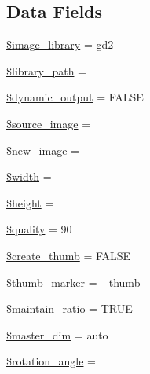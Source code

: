 \subsection*{Data Fields}
\begin{DoxyCompactItemize}
\item 
\mbox{\hyperlink{class_c_i___image__lib_ac4b224358e1169eec8db344bcb3186c0}{\$image\+\_\+library}} = \textquotesingle{}gd2\textquotesingle{}
\item 
\mbox{\hyperlink{class_c_i___image__lib_ac09f7fc802884aae2149f1df0e53f17a}{\$library\+\_\+path}} = \textquotesingle{}\textquotesingle{}
\item 
\mbox{\hyperlink{class_c_i___image__lib_ad90737913d82776e7d3a7dfaef68e167}{\$dynamic\+\_\+output}} = F\+A\+L\+SE
\item 
\mbox{\hyperlink{class_c_i___image__lib_a54fc395722d5e9f15d656d22ba84e382}{\$source\+\_\+image}} = \textquotesingle{}\textquotesingle{}
\item 
\mbox{\hyperlink{class_c_i___image__lib_a6147ac30032312f2b42a9b05618faf12}{\$new\+\_\+image}} = \textquotesingle{}\textquotesingle{}
\item 
\mbox{\hyperlink{class_c_i___image__lib_a5795120b4b324bc4ca83f1e6fdce7d57}{\$width}} = \textquotesingle{}\textquotesingle{}
\item 
\mbox{\hyperlink{class_c_i___image__lib_a2c265bba1724371bb03e6901297c30b2}{\$height}} = \textquotesingle{}\textquotesingle{}
\item 
\mbox{\hyperlink{class_c_i___image__lib_a0e342ea32cccdc2c932ad23b9796a62a}{\$quality}} = 90
\item 
\mbox{\hyperlink{class_c_i___image__lib_ab1250903cbadaaadb42ec188d38ab398}{\$create\+\_\+thumb}} = F\+A\+L\+SE
\item 
\mbox{\hyperlink{class_c_i___image__lib_a3176700c651c0c3cd8cfa186ba03302a}{\$thumb\+\_\+marker}} = \textquotesingle{}\+\_\+thumb\textquotesingle{}
\item 
\mbox{\hyperlink{class_c_i___image__lib_a7fe1beb3e7d60245c97c60ee4b668d93}{\$maintain\+\_\+ratio}} = \mbox{\hyperlink{constants_8php_ae04a3efe6aa42044f803ee90c2277846}{T\+R\+UE}}
\item 
\mbox{\hyperlink{class_c_i___image__lib_ae86c3d7ce316cc0c48a8dcba8ae4130d}{\$master\+\_\+dim}} = \textquotesingle{}auto\textquotesingle{}
\item 
\mbox{\hyperlink{class_c_i___image__lib_a9410d2e216c0c1dd852031f2a39e7ec7}{\$rotation\+\_\+angle}} = \textquotesingle{}\textquotesingle{}
\item 

\end{DoxyCompactItemize}
